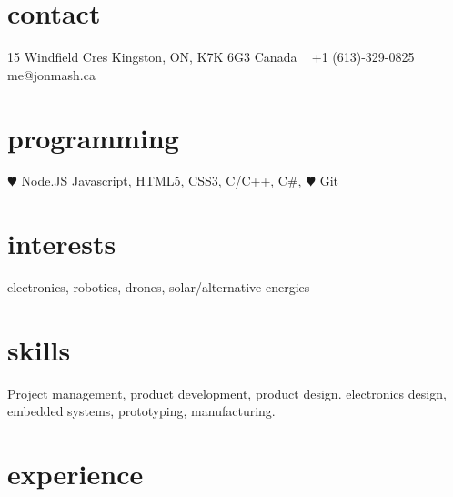 \documentclass[]{cv-style}          %
\begin{document}
\lastupdated


\begin{aside}
%
\section{contact}
15 Windfield Cres
Kingston, ON, K7K 6G3
Canada
~
+1 (613)-329-0825
~
me@jonmash.ca
%
\section{programming}
{\color{red} $\varheartsuit$} Node.JS
Javascript, HTML5, CSS3, C/C++, C\#, 
{\color{red} $\varheartsuit$} Git
%
\section{interests}
electronics, robotics, drones, solar/alternative energies
%
\end{aside}


\section{skills}
  \vspace{-0.2cm}

Project management, product development, product design. electronics design, embedded systems, prototyping, manufacturing.


\section{experience}
\end{document}
